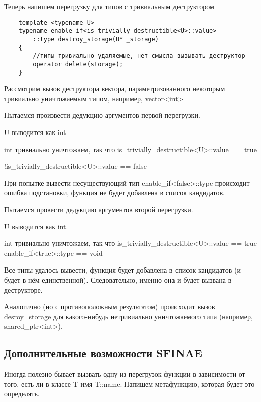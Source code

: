 	Теперь напишем перегрузку для типов с тривиальным деструктором

	\begin{verbatim}
	template <typename U>
	typename enable_if<is_trivially_destructible<U>::value>
	    ::type destroy_storage(U* _storage)
	{
	    //типы тривиально удаляемые, нет смысла вызывать деструктор
	    operator delete(storage);
	}
	\end{verbatim}
	
	Рассмотрим вызов деструктора вектора, параметризованного некоторым тривиально уничтожаемым типом, например, vector<int>
	
	Пытаемся произвести дедукцию аргументов первой перегрузки.
	
	U выводится как int
	
	int тривиально уничтожаем, так что is\_trivially\_destructible<U>::value == true
	
	!is\_trivially\_destructible<U>::value == false
	
	При попытке вывести несуществующий тип enable\_if<false>::type происходит ошибка подстановки, функция не будет добавлена в список кандидатов.
	
	\vspace{\baselineskip}		
	
	Пытаемся провести дедукцию аргументов второй перегрузки.
	
	U выводится как int.
	
	int тривиально уничтожаем, так что is\_trivially\_destructible<U>::value == true
	enable\_if<true>::type == void
	
	Все типы удалось вывести, функция будет добавлена в список кандидатов (и будет в нём единственной). Следовательно, именно она и будет вызвана в деструкторе.
	
	\vspace{\baselineskip}		
	
	Аналогично (но с противоположным результатом) происходит вызов desroy\_storage для какого-нибудь нетривиально уничтожаемого типа (например, shared\_ptr<int>).

	\subsection{Дополнительные возможности SFINAE}
	
	Иногда полезно бывает вызвать одну из перегрузок функции в зависимости от того, есть ли в классе T имя T::name. Напишем метафункцию, которая будет это определять.

